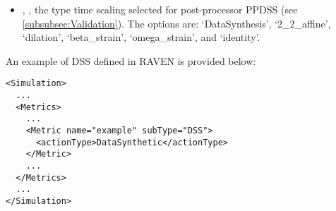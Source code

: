 \begin{itemize}
  \item {}, , the type time scaling selected for post-processor PPDSS (see \ref{subsubsec:Validation}). The options are: `DataSynthesis', `2\_2\_affine', `dilation', `beta\_strain', `omega\_strain', and `identity'.
\end{itemize}

An example of DSS  defined in RAVEN is provided below:
\begin{lstlisting}[style=XML]
<Simulation>
  ...
  <Metrics>
    ...
    <Metric name="example" subType="DSS">
      <actionType>DataSynthetic</actionType>
    </Metric>
    ...
  </Metrics>
  ...
</Simulation>
\end{lstlisting}
